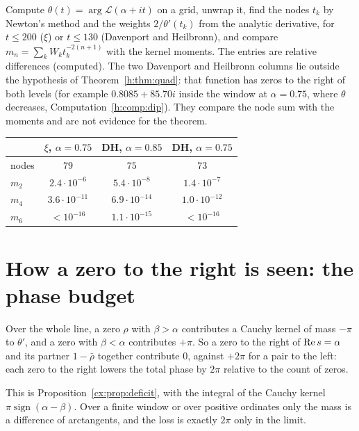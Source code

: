 \begin{computation}\label{h:comp:quad}
Compute $\theta(t)=\arg\mathcal L(\alpha+it)$ on a grid, unwrap it, find the nodes $t_k$ by Newton's method and the weights $2/\theta'(t_k)$ from the analytic derivative, for $t\le200$ ($\xi$) or $t\le130$ (Davenport and Heilbronn), and compare $m_n=\sum_kW_kt_k^{-2(n+1)}$ with the kernel moments. The entries are relative differences (computed). The two Davenport and Heilbronn columns lie outside the hypothesis of Theorem~\ref{h:thm:quad}: that function has zeros to the right of both levels (for example $0.8085+85.70i$ inside the window at $\alpha=0.75$, where $\theta$ decreases, Computation~\ref{h:comp:dip}). They compare the node sum with the moments and are not evidence for the theorem.
\begin{center}\small
\begin{tabular}{@{}lccc@{}}
\toprule
& $\xi$, $\alpha=0.75$ & DH, $\alpha=0.85$ & DH, $\alpha=0.75$\\
\midrule
nodes & $79$ & $75$ & $73$\\
$m_2$ & $2.4\cdot10^{-6}$ & $5.4\cdot10^{-8}$ & $1.4\cdot10^{-7}$\\
$m_4$ & $3.6\cdot10^{-11}$ & $6.9\cdot10^{-14}$ & $1.0\cdot10^{-12}$\\
$m_6$ & $<10^{-16}$ & $1.1\cdot10^{-15}$ & $<10^{-16}$\\
\bottomrule
\end{tabular}
\end{center}
\end{computation}

\section{How a zero to the right is seen: the phase budget}

\begin{proposition}\label{h:prop:budget}
Over the whole line, a zero $\rho$ with $\beta>\alpha$ contributes a Cauchy kernel of mass $-\pi$ to $\theta'$, and a zero with $\beta<\alpha$ contributes $+\pi$. So a zero to the right of $\operatorname{Re} s=\alpha$ and its partner $1-\bar\rho$ together contribute $0$, against $+2\pi$ for a pair to the left: each zero to the right lowers the total phase by $2\pi$ relative to the count of zeros.
\end{proposition}

This is Proposition~\ref{cx:prop:deficit}, with the integral of the Cauchy kernel $\pi\operatorname{sign}(\alpha-\beta)$. Over a finite window or over positive ordinates only the mass is a difference of arctangents, and the loss is exactly $2\pi$ only in the limit.

